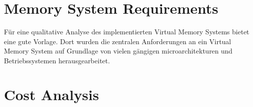 \section{Memory System Requirements}
Für eine qualitative Analyse des implementierten Virtual Memory Systems bietet \cite{jacobSoftwaremanagedAddressTranslation1997}
eine gute Vorlage. Dort wurden die zentralen Anforderungen an ein Virtual Memory System auf Grundlage
von vielen gängigen microarchitekturen und Betriebssystemen herausgearbeitet.





\section{Cost Analysis}





